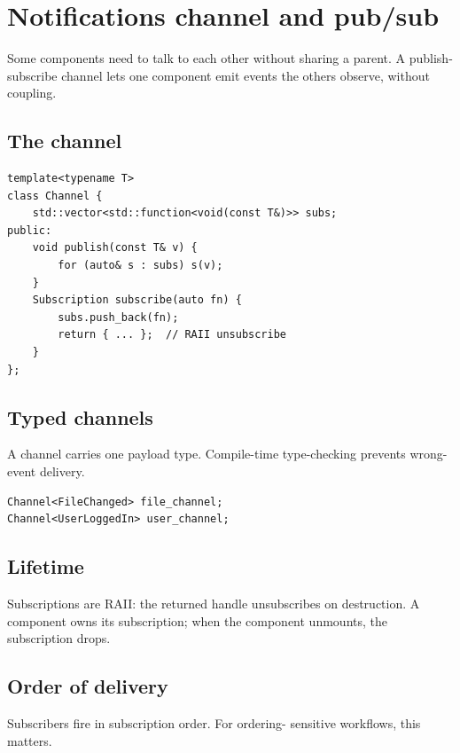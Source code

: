 \chapter{Notifications channel and pub/sub}
\label{ch:pubsub}

\begin{aside}
Some components need to talk to each other without sharing a
parent. A publish-subscribe channel lets one component emit
events the others observe, without coupling.
\end{aside}

\section{The channel}

\begin{lstlisting}
template<typename T>
class Channel {
    std::vector<std::function<void(const T&)>> subs;
public:
    void publish(const T& v) {
        for (auto& s : subs) s(v);
    }
    Subscription subscribe(auto fn) {
        subs.push_back(fn);
        return { ... };  // RAII unsubscribe
    }
};
\end{lstlisting}

\section{Typed channels}

A channel carries one payload type. Compile-time
type-checking prevents wrong-event delivery.

\begin{lstlisting}
Channel<FileChanged> file_channel;
Channel<UserLoggedIn> user_channel;
\end{lstlisting}

\section{Lifetime}

Subscriptions are RAII: the returned handle unsubscribes
on destruction. A component owns its subscription; when
the component unmounts, the subscription drops.

\section{Order of delivery}

Subscribers fire in subscription order. For ordering-
sensitive workflows, this matters.

